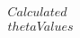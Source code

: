 \documentclass[preview]{standalone}
\begin{document}
\begin{align*}
Calculated \\theta Values
\end{align*}
\end{document}
